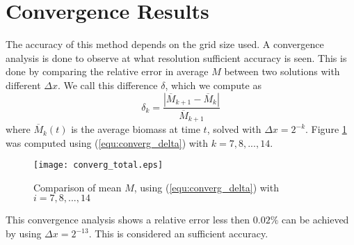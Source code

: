 




\section{Convergence Results}


The accuracy of this method depends on the grid size used. A convergence analysis is done to observe at what resolution sufficient accuracy is seen. This is done by comparing the relative error in average $M$ between two solutions with different $\Delta x$. We call this difference $\delta$, which we compute as
\begin{equation} \label{equ:converg_delta}
    \delta_k = \frac{\left|\overline{M}_{k+1} - \overline{M}_{k} \right|}{\overline{M}_{k+1}}
\end{equation}
where $\overline{M}_{k}(t)$ is the average biomass at time $t$, solved with $\Delta x = 2^{-k}$. Figure \ref{fig:converg_average} was computed using (\ref{equ:converg_delta}) with $k = 7,8,...,14$. 


\begin{figure}[!htb]
    \begin{center}
        \texttt{[image: converg\_total.eps]}
        \caption{Comparison of mean $M$, using (\ref{equ:converg_delta}) with $i = 7,8,...,14$}
        \label{fig:converg_average}
    \end{center}
\end{figure}

This convergence analysis shows a relative error less then $0.02\%$ can be achieved by using $\Delta x = 2^{-13}$. This is considered an sufficient accuracy.

